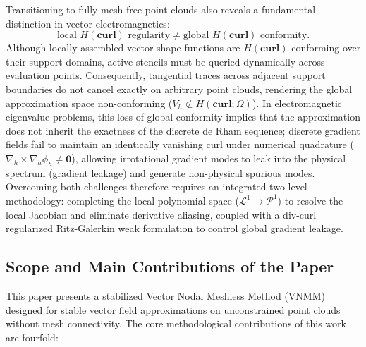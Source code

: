 \documentclass[preprint,12pt]{elsarticle}
\begin{document}
Transitioning to fully mesh-free point clouds also reveals a fundamental distinction in vector electromagnetics:
\begin{equation}
    \boxed{\text{local } H(\mathbf{curl}) \text{ regularity} \neq \text{global } H(\mathbf{curl}) \text{ conformity}.}
    \label{eq:local_reg_vs_global_conf}
\end{equation}
Although locally assembled vector shape functions are $H(\mathbf{curl})$-conforming over their support domains, active stencils must be queried dynamically across evaluation points. Consequently, tangential traces across adjacent support boundaries do not cancel exactly on arbitrary point clouds, rendering the global approximation space non-conforming ($V_h \not\subset H(\mathbf{curl}; \Omega)$). In electromagnetic eigenvalue problems, this loss of global conformity implies that the approximation does not inherit the exactness of the discrete de Rham sequence; discrete gradient fields fail to maintain an identically vanishing curl under numerical quadrature ($\nabla_h \times \nabla_h \phi_h \neq \mathbf{0}$), allowing irrotational gradient modes to leak into the physical spectrum (gradient leakage) and generate non-physical spurious modes. Overcoming both challenges therefore requires an integrated two-level methodology: completing the local polynomial space ($\mathcal{L}^1 \to \mathcal{P}^1$) to resolve the local Jacobian and eliminate derivative aliasing, coupled with a div-curl regularized Ritz-Galerkin weak formulation to control global gradient leakage.

\subsection{Scope and Main Contributions of the Paper}
\label{subsec:scope_contributions}
This paper presents a stabilized Vector Nodal Meshless Method (VNMM) designed for stable vector field approximations on unconstrained point clouds without mesh connectivity. The core methodological contributions of this work are fourfold:
\end{document}
